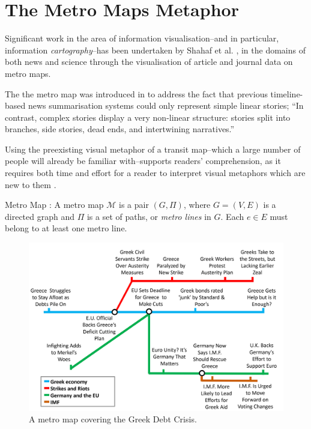 \section{The Metro Maps Metaphor}
Significant work in the area of information visualisation--and in particular, information \textit{cartography}--has been undertaken by Shahaf et al. \citep{ConnectingTheDots, GeneratingInformationMaps, MetroMapsOfScience, InformationCartographyPre}, in the domains of both news and science through the visualisation of article and journal data on metro maps.

The the metro map was introduced in \citep{GeneratingInformationMaps} to address the fact that previous timeline-based news summarisation systems could only represent simple linear stories; ``In contrast, complex stories display a very non-linear structure: stories split into branches, side stories, dead ends, and intertwining narratives.'' \citep[p.1]{InformationCartographyPre}

Using the preexisting visual metaphor of a transit map--which a large number of people will already be familiar with--supports readers' comprehension, as it requires both time and effort for a reader to interpret visual metaphors which are new to them \citep{PreconceptionsVisualMetaphors}.

\begin{definition}{Metro Map \citep{GeneratingInformationMaps}:}
A metro map $\mathcal{M}$ is a pair $(G, \Pi)$, where $G=(V, E)$ is a directed graph and $\Pi$ is a set of paths, or \textit{metro lines} in $G$. Each $e \in E$ must belong to at least one metro line.
\end{definition}

\begin{figure}[htbp!]
	\centering
	\includegraphics[width=.9\textwidth]{img/lit-survey/greece-metromap.jpg}
	\caption{A metro map \citep{GeneratingInformationMaps} covering the Greek Debt Crisis.}
	\label{fig:greecemetro}
\end{figure}

